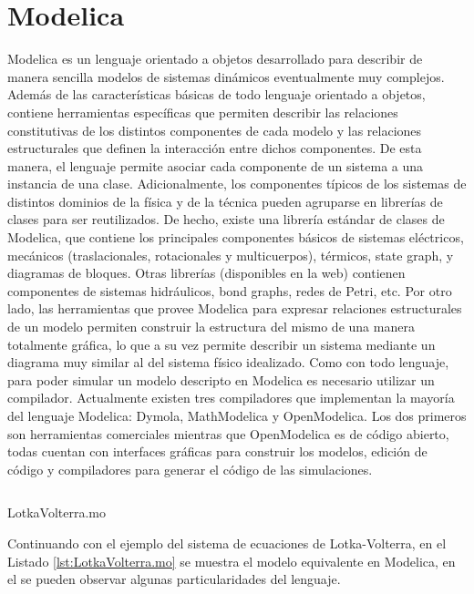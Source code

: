 	

\section{Modelica}\label{sec:modelica}

	Modelica\cite{Fri98}\cite{Fritzson02modelica} es un lenguaje orientado a objetos desarrollado para describir de manera sencilla modelos de sistemas 
	dinámicos eventualmente muy complejos.
	Además de las características básicas de todo lenguaje orientado a objetos, contiene herramientas específicas que permiten describir las relaciones
	constitutivas de los distintos componentes de cada modelo y las relaciones estructurales que definen la interacción entre dichos componentes.
	De esta manera, el lenguaje permite asociar cada componente de un sistema a una instancia de una clase.
	Adicionalmente, los componentes típicos de los sistemas de distintos dominios de la física y de la técnica pueden agruparse en librerías de clases para ser
	reutilizados. De hecho, existe una librería estándar de clases de Modelica, que contiene los principales componentes básicos de sistemas eléctricos,
	mecánicos (traslacionales, rotacionales y multicuerpos), térmicos, state graph, y diagramas de bloques. 
	Otras librerías (disponibles en la web) contienen componentes de sistemas hidráulicos, bond graphs, redes de Petri, etc.
	Por otro lado, las herramientas que provee Modelica para expresar relaciones estructurales de un modelo permiten construir la estructura del mismo de una
	manera totalmente gráfica, lo que a su vez permite describir un sistema mediante un diagrama muy similar al del sistema físico idealizado.
	Como con todo lenguaje, para poder simular un modelo descripto en Modelica es necesario utilizar un compilador. Actualmente existen tres compiladores
	que implementan la mayoría del lenguaje Modelica: Dymola, MathModelica y OpenModelica. Los dos primeros son herramientas comerciales mientras que OpenModelica es de código
	abierto, todas cuentan con interfaces gráficas para construir los modelos, edición de código y compiladores para generar el código de las simulaciones.

\begin{listing}[H]    
	\inputminted[linenos]{modelica}{src/LotkaVolterra.mo}
	\caption{LotkaVolterra.mo}\label{lst:LotkaVolterra.mo}
\end{listing}
	
	Continuando con el ejemplo del sistema de ecuaciones de Lotka-Volterra, en el Listado \ref{lst:LotkaVolterra.mo} se muestra el modelo equivalente en Modelica, 
	en el se pueden observar algunas particularidades del lenguaje.
	
